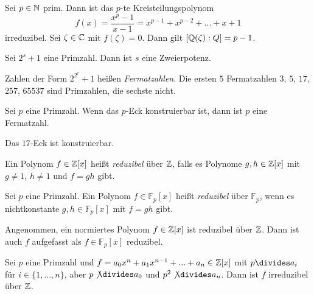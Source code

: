 \documentclass{cheat-sheet}
\newcommand{\F}{\mathbb{F}} %
\begin{document}
\begin{lem}
  Sei $p \in \mathbb{N}$ prim. Dann ist das $p$-te Kreisteilungspolynom
  \[ f(x) = \frac{x^p - 1}{x-1} = x^{p-1} + x^{p-2} + ... + x + 1 \]
  irreduzibel. Sei $\zeta \in \mathbb{C}$ mit $f(\zeta) = 0$. Dann gilt $[ \mathbb{Q}(\zeta) : Q ] = p-1$.
\end{lem}

\begin{lem}
  Sei $2^s + 1$ eine Primzahl. Dann ist $s$ eine Zweierpotenz.
\end{lem}

\begin{bem}
  Zahlen der Form $2^{2^r} + 1$ heißen \emph{Fermatzahlen}. Die ersten $5$ Fermatzahlen
  $3$, $5$, $17$, $257$, $65537$ sind Primzahlen, die sechste nicht.
\end{bem}

\begin{satz}
  Sei $p$ eine Primzahl. Wenn das $p$-Eck konstruierbar ist, dann ist $p$ eine Fermatzahl.
\end{satz}

\begin{satz}[Gauß]
  Das $17$-Eck ist konstruierbar.
\end{satz}


\begin{defn}
  Ein Polynom $f \in \mathbb{Z}[x]$ heißt \emph{reduzibel} über $\mathbb{Z}$, falls es Polynome $g, h \in \mathbb{Z}[x]$ mit $g \not= 1$, $h \not= 1$ und $f = gh$ gibt.
\end{defn}

\begin{defn}
  Sei $p$ eine Primzahl. Ein Polynom $f \in \F_p[x]$ heißt \emph{reduzibel} über $\F_p$, wenn es nichtkonstante $g, h \in \F_p[x]$ mit $f = gh$ gibt.
\end{defn}

\begin{defn}
  Angenommen, ein normiertes Polynom $f \in \mathbb{Z}[x]$ ist reduzibel über $\mathbb{Z}$. Dann ist auch $f$ aufgefasst als $f \in \F_p[x]$ reduzibel.
\end{defn}

\begin{satz}[Eisenstein]
  Sei $p$ eine Primzahl und $f = a_0 x^n + a_1 x^{n-1} + ... + a_n \in \mathbb{Z}[x]$ mit $p \divides a_i$ für $i \in \{ 1, ..., n \}$, aber $p \not\divides a_0$ und $p^2 \not\divides a_n$. Dann ist $f$ irreduzibel über $\mathbb{Z}$.
\end{satz}
\end{document}
